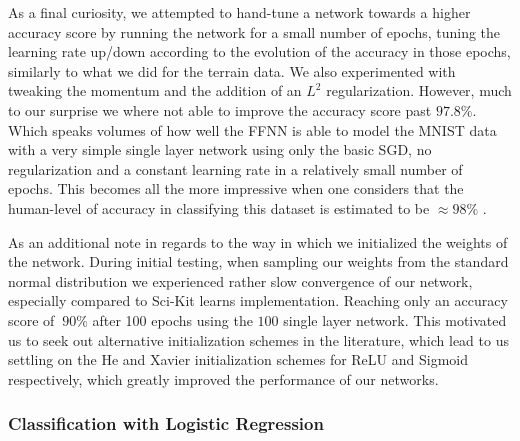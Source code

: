 \documentclass[reprint, english, nofootinbib]{revtex4-2}
\begin{document}
As a final curiosity, we attempted to hand-tune a network towards a higher accuracy score by running the network for a small number of epochs, tuning the learning rate up/down according to the evolution of the accuracy in those epochs, similarly to what we did for the terrain data. We also experimented with tweaking the momentum and the addition of an $L^2$ regularization.
However, much to our surprise we where not able to improve the accuracy score past $97.8\%$. Which speaks volumes of how well the FFNN is able to model the MNIST data with a very simple single layer network using only the basic SGD, no regularization and a constant learning rate in a relatively small number of epochs. This becomes all the more impressive when one considers that the human-level of accuracy in classifying this dataset is estimated to be $\approx 98\%$ \cite{MHJ_W41}.

As an additional note in regards to the way in which we initialized the weights of the network. During initial testing, when sampling our weights from the standard normal distribution we experienced rather slow convergence of our network, especially compared to Sci-Kit learns implementation. Reaching only an accuracy score of $~90\%$ after 100 epochs using the $100$ single layer network. This motivated us to seek out alternative initialization schemes in the literature, which lead to us settling on the He \cite{he2015delving} and Xavier \cite{xavier} initialization schemes for ReLU and Sigmoid respectively, which greatly improved the performance of our networks.
\subsubsection{Classification with Logistic Regression}
\end{document}
